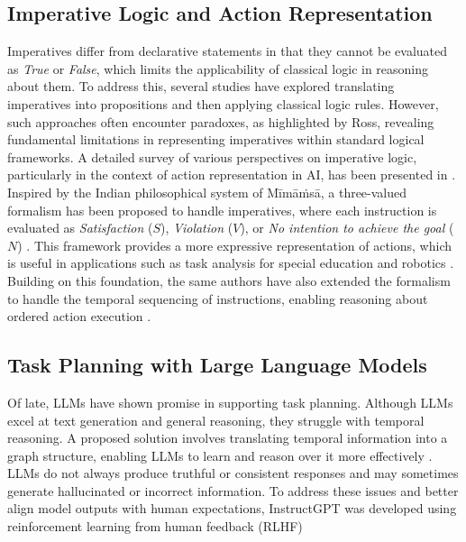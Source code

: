 \documentclass[a4paper,11pt]{lmcs}
\newcommand{\mimamsa}{M\={i}m\={a}\.ms\={a}}
\begin{document}
\subsection*{Imperative Logic and Action Representation}
Imperatives differ from declarative statements in that they cannot be evaluated as \textit{True} or \textit{False}, which limits the applicability of classical logic in reasoning about them. To address this, several studies have explored translating imperatives into propositions and then applying classical logic rules. However, such approaches often encounter paradoxes, as highlighted by Ross, revealing fundamental limitations in representing imperatives within standard logical frameworks. A detailed survey of various perspectives on imperative logic, particularly in the context of action representation in AI, has been presented in \citep{survey}. Inspired by the Indian philosophical system of \mimamsa, a three-valued formalism has been proposed to handle imperatives, where each instruction is evaluated as \textit{Satisfaction} ($S$), \textit{Violation} ($V$), or \textit{No intention to achieve the goal} ($N$) \citep{mira}. This framework provides a more expressive representation of actions, which is useful in applications such as
 task analysis for special education \citep{ta} and robotics \citep{mira_robot}. Building on this foundation, the same authors have also extended the formalism to handle the temporal sequencing of instructions, enabling reasoning about ordered action execution \citep{llmmira}.

\subsection*{Task Planning with Large Language Models}
Of late, LLMs have shown promise in supporting task planning. Although LLMs excel at text generation and general reasoning, they struggle with temporal reasoning. A proposed solution involves translating temporal information into a graph structure, enabling LLMs to learn and reason over it more effectively \citep{xiong}. LLMs do not always produce truthful or consistent responses and may sometimes generate hallucinated or incorrect information. To address these issues and better align model outputs with human expectations, InstructGPT was developed using reinforcement learning from human feedback (RLHF) \citep{llm_human}
\end{document}
